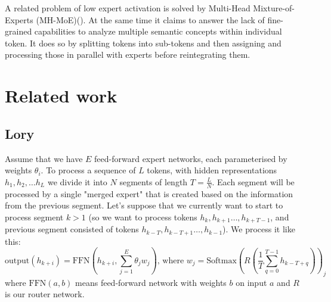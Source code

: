\documentclass[12pt]{article}
\begin{document}
A related problem of low expert activation is solved by Multi-Head Mixture-of-Experts (MH-MoE)(\cite{wu2024multihead}). At the same time it claims to answer the lack of fine-grained capabilities to analyze multiple semantic concepts within individual token. 
It does so by splitting tokens into sub-tokens and then assigning and processing those in parallel with experts before reintegrating them. 

 
\section{Related work}

\subsection{Lory}
Assume that we have $E$ feed-forward expert networks, each parameterised by weights $\theta_i$. To process a sequence of $L$ tokens, with hidden representations $h_1, h_2, \dots h_L$ we divide it into $N$ segments of length $T = \frac{L}{N}$. Each segment will be processed by a single "merged expert" that is created based on the information from the previous segment. Let's suppose that we currently want to start to process segment $k>1$ (so we want to process tokens $h_k, h_{k+1}\dots ,h_{k+T -1}$, and previous segment consisted of tokens $h_{k - T}, h_{k-T+1}\dots ,h_{k-1}$). We process it like this:
\[\text{output}(h_{k + i}) = \text{FFN}(h_{k+i}, \sum_{j=1}^E \theta_j w_j) \text{,   where  } w_j = \text{Softmax}(R(\frac{1}{T}\sum_{q = 0}^{T-1}h_{k-T+q}))_j\] where $\text{FFN}(a, b)$ means feed-forward network with weights $b$ on input $a$ and $R$ is our router network.
\end{document}
